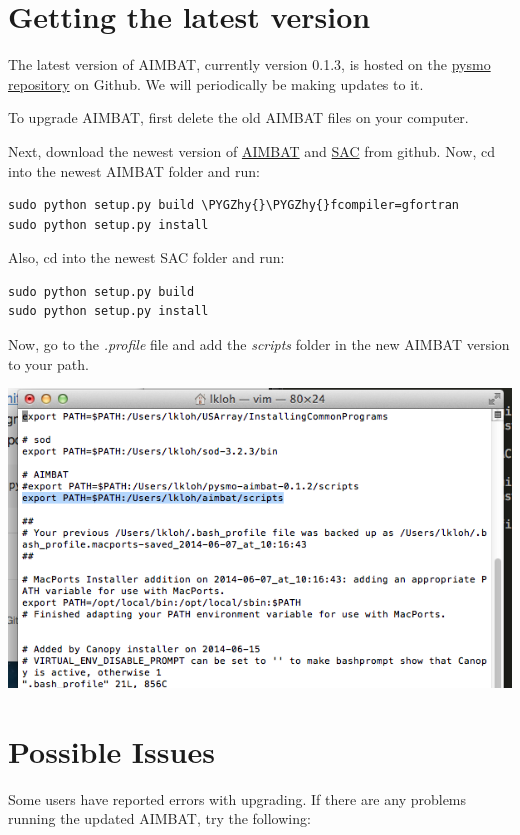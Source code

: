\documentclass[letterpaper,10pt,english]{sphinxmanual}
\def\PYGZhy{\char`\-}
\begin{document}
\section{Getting the latest version}
\label{docfiles/upgrading_aimbat:getting-the-latest-version}
The latest version of AIMBAT, currently version 0.1.3, is hosted on the \href{https://github.com/pysmo}{pysmo repository} on Github. We will periodically be making updates to it.

To upgrade AIMBAT, first delete the old AIMBAT files on your computer.

Next, download the newest version of \href{https://github.com/pysmo/aimbat}{AIMBAT} and \href{https://github.com/pysmo/sac}{SAC} from github. Now, cd into the newest AIMBAT folder and run:

\begin{Verbatim}[commandchars=\\\{\}]
sudo python setup.py build \PYGZhy{}\PYGZhy{}fcompiler=gfortran
sudo python setup.py install
\end{Verbatim}

Also, cd into the newest SAC folder and run:

\begin{Verbatim}[commandchars=\\\{\}]
sudo python setup.py build
sudo python setup.py install
\end{Verbatim}

Now, go to the \emph{.profile} file and add the \emph{scripts} folder in the new AIMBAT version to your path.

\includegraphics{upgrade-profile.png}


\section{Possible Issues}
\label{docfiles/upgrading_aimbat:possible-issues}
Some users have reported errors with upgrading. If there are any problems running the updated AIMBAT, try the following:
\end{document}
